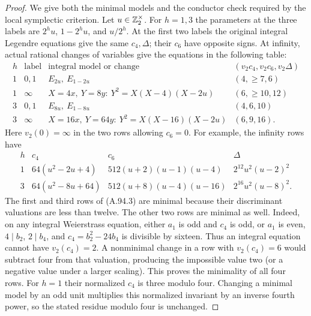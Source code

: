 \begin{proof}
We give both the minimal models and the conductor
check required by the local symplectic criterion.
Let $u\in\mathbb Z_2^\times$.  For $h=1,3$ the parameters
at the three labels are
$2^h u$, $1-2^h u$, and $u/2^h$.
At the first two labels the original integral
Legendre equations give the same $c_4,\Delta$;
their $c_6$ have opposite signs.
At infinity, actual rational changes of variables
give the equations in the following table:
\[
\begin{array}{c|c|c|c}
 h&\text{label}&\text{integral model or change}
                    &(v_2c_4,v_2c_6,v_2\Delta)\\ \hline
 1&0,1&E_{2u},\ E_{1-2u}&(4,\ge7,6)\\
 1&\infty&X=4x,\ Y=8y:\ Y^2=X(X-4)(X-2u)
                                     &(6,\ge10,12)\\
 3&0,1&E_{8u},\ E_{1-8u}&(4,6,10)\\
 3&\infty&X=16x,\ Y=64y:\ Y^2=X(X-16)(X-2u)
                                     &(6,9,16).
\end{array}
\tag{A.94.3}
\]
Here $v_2(0)=\infty$ in the two rows allowing $c_6=0$.
For example, the infinity rows have
\[
\begin{array}{c|c|c|c}
 h&c_4&c_6&\Delta\\ \hline
 1&64(u^2-2u+4)&512(u+2)(u-1)(u-4)
                              &2^{12}u^2(u-2)^2\\
 3&64(u^2-8u+64)&512(u+8)(u-4)(u-16)
                              &2^{16}u^2(u-8)^2.
\end{array}
\tag{A.94.4}
\]
The first and third rows of (A.94.3) are minimal
because their discriminant valuations are less
than twelve.  The other two rows are minimal as
well.  Indeed, on any integral Weierstrass equation,
either $a_1$ is odd and $c_4$ is odd, or $a_1$ is
even, $4\mid b_2$, $2\mid b_4$, and
$c_4=b_2^2-24b_4$ is divisible by sixteen.
Thus an integral equation cannot have $v_2(c_4)=2$.
A nonminimal change in a row with $v_2(c_4)=6$
would subtract four from that valuation, producing
the impossible value two (or a negative value
under a larger scaling).
This proves the minimality of all four rows.
For $h=1$ their normalized $c_4$ is three modulo four.
Changing a minimal model by an odd unit multiplies
this normalized invariant by an inverse fourth
power, so the stated residue modulo four is unchanged.


\end{proof}
